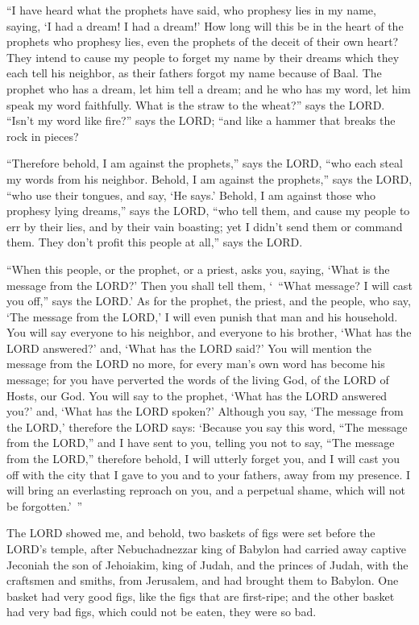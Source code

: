\myverse{}“I have heard what the prophets have said, who prophesy lies in my name, saying, ‘I had a dream! I had a dream!’ \myverse{}How long will this be in the heart of the prophets who prophesy lies, even the prophets of the deceit of their own heart? \myverse{}They intend to cause my people to forget my name by their dreams which they each tell his neighbor, as their fathers forgot my name because of Baal. \myverse{}The prophet who has a dream, let him tell a dream; and he who has my word, let him speak my word faithfully. What is the straw to the wheat?” says the LORD. \myverse{}“Isn’t my word like fire?” says the LORD; “and like a hammer that breaks the rock in pieces?


\myverse{}“Therefore behold, I am against the prophets,” says the LORD, “who each steal my words from his neighbor. \myverse{}Behold, I am against the prophets,” says the LORD, “who use their tongues, and say, ‘He says.’ \myverse{}Behold, I am against those who prophesy lying dreams,” says the LORD, “who tell them, and cause my people to err by their lies, and by their vain boasting; yet I didn’t send them or command them. They don’t profit this people at all,” says the LORD.


\myverse{}“When this people, or the prophet, or a priest, asks you, saying, ‘What is the message from the LORD?’ Then you shall tell them, ‘ “What message? I will cast you off,” says the LORD.’ \myverse{}As for the prophet, the priest, and the people, who say, ‘The message from the LORD,’ I will even punish that man and his household. \myverse{}You will say everyone to his neighbor, and everyone to his brother, ‘What has the LORD answered?’ and, ‘What has the LORD said?’ \myverse{}You will mention the message from the LORD no more, for every man’s own word has become his message; for you have perverted the words of the living God, of the LORD of Hosts, our God. \myverse{}You will say to the prophet, ‘What has the LORD answered you?’ and, ‘What has the LORD spoken?’ \myverse{}Although you say, ‘The message from the LORD,’ therefore the LORD says: ‘Because you say this word, “The message from the LORD,” and I have sent to you, telling you not to say, “The message from the LORD,” \myverse{}therefore behold, I will utterly forget you, and I will cast you off with the city that I gave to you and to your fathers, away from my presence. \myverse{}I will bring an everlasting reproach on you, and a perpetual shame, which will not be forgotten.’ ”


\mychapter{}\myverse*{}The LORD showed me, and behold, two baskets of figs were set before the LORD’s temple, after Nebuchadnezzar king of Babylon had carried away captive Jeconiah the son of Jehoiakim, king of Judah, and the princes of Judah, with the craftsmen and smiths, from Jerusalem, and had brought them to Babylon. \myverse{}One basket had very good figs, like the figs that are first-ripe; and the other basket had very bad figs, which could not be eaten, they were so bad.


